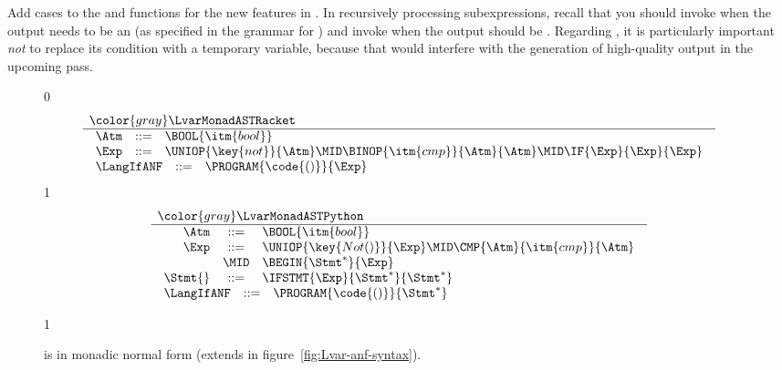 \documentclass[7x10]{TimesAPriori_MIT}%
\newcommand{\gray}[1]{{\color{gray} #1}}
\def\racketEd{0}
\def\pythonEd{1}
\def\edition{1}
\newcommand{\pythonColor}[0]{}
\newcommand{\python}[1]{{\if\edition\pythonEd\pythonColor #1\fi}}
\numberwithin{theorem}{chapter}
\numberwithin{definition}{chapter}
\numberwithin{equation}{chapter}
\begin{document}
Add cases to the  and  functions for
the new features in \LangIf{}. In recursively processing
subexpressions, recall that you should invoke  when
the output needs to be an \Atm{} (as specified in the grammar for
\LangIfANF{}) and invoke  when the output should be
\Exp{}.  Regarding , it is particularly important 
\emph{not} to replace its condition with a temporary variable, because
that would interfere with the generation of high-quality output in the
upcoming  pass.

\newcommand{\LifMonadASTRacket}{
\begin{array}{rcl}
\Atm &::=& \BOOL{\itm{bool}}\\
\Exp &::=& \UNIOP{\key{not}}{\Atm} 
     \MID \BINOP{\itm{cmp}}{\Atm}{\Atm} 
     \MID \IF{\Exp}{\Exp}{\Exp} 
\end{array}
}
  
\newcommand{\LifMonadASTPython}{
\begin{array}{rcl}
\Atm &::=& \BOOL{\itm{bool}}\\
\Exp &::=& \UNIOP{\key{Not()}}{\Exp}
           \MID \CMP{\Atm}{\itm{cmp}}{\Atm} \\
     &\MID&
            \BEGIN{\Stmt^{*}}{\Exp}\\
\Stmt{} &::=& \IFSTMT{\Exp}{\Stmt^{*}}{\Stmt^{*}}
\end{array}
}

\begin{figure}[tp]
\centering
\begin{tcolorbox}[colback=white]
{\if\edition\racketEd    
\[
\begin{array}{l}
  \gray{\LvarMonadASTRacket} \\ \hline
  \LifMonadASTRacket \\
\begin{array}{rcl}
\LangIfANF  &::=& \PROGRAM{\code{()}}{\Exp}
\end{array}
\end{array}
\]
\fi}
{\if\edition\pythonEd\pythonColor
\[
\begin{array}{l}
  \gray{\LvarMonadASTPython} \\ \hline
  \LifMonadASTPython \\
   \begin{array}{rcl}
     \LangIfANF  &::=& \PROGRAM{\code{()}}{\Stmt^{*}}
   \end{array}
\end{array}
\]
\fi}
\end{tcolorbox}
\python{}
\caption{\LangIfANF{} is \LangIf{} in monadic normal form
  (extends \LangVarANF in figure~\ref{fig:Lvar-anf-syntax}).}
\label{fig:Lif-anf-syntax}
\end{figure}
\end{document}
